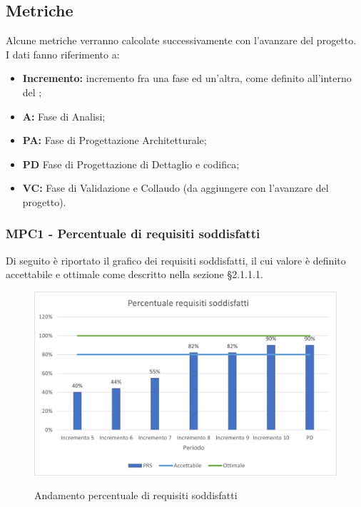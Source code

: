 \subsection{Metriche}
Alcune metriche verranno calcolate successivamente con l'avanzare del progetto.\\

I dati fanno riferimento a:
\begin{itemize}
	\item \textbf{Incremento:} incremento fra una fase ed un'altra, come definito all'interno del ;
	\item \textbf{A:} Fase di Analisi;
	\item \textbf{PA:} Fase di Progettazione Architetturale;
	\item \textbf{PD} Fase di Progettazione di Dettaglio e codifica;
	\item \textbf{VC: } Fase di Validazione e Collaudo (da aggiungere con l'avanzare del progetto).
\end{itemize}

\subsubsection{MPC1 - Percentuale di requisiti soddisfatti}
Di seguito è riportato il grafico dei requisiti soddisfatti, il cui valore è definito accettabile e ottimale come descritto nella sezione §2.1.1.1.\\

\begin{figure}[H]
\centering
\includegraphics[scale=0.78]{res/ResocontoAttivitaDiVerifica/res/metriche/grafici/img/PRS.png}\\
\caption{Andamento percentuale di requisiti soddisfatti}
\end{figure}

